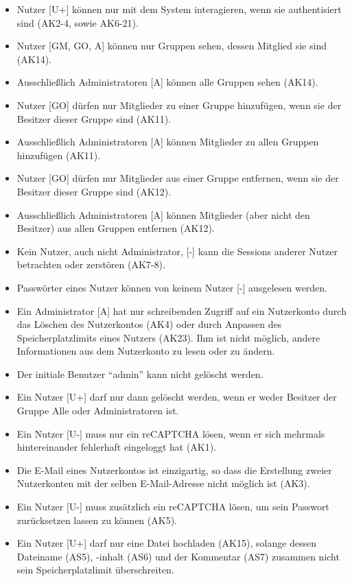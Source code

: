 \documentclass[fontsize=12pt,DIV=14,BCOR=10mm,a4paper,parskip=half-,headsepline,headinclude,english,ngerman,bibliography=totocnumbered]{scrreprt}
\begin{document}
\label{security-policies:new_policies}
\begin{itemize}
  \item Nutzer [U+] können nur mit dem System interagieren, wenn sie authentisiert sind (AK2-4, sowie AK6-21).
  \item Nutzer [GM, GO, A] können nur Gruppen sehen, dessen Mitglied sie sind (AK14).
  \item Ausschließlich Administratoren [A] können alle Gruppen sehen (AK14).
  \item Nutzer [GO] dürfen nur Mitglieder zu einer Gruppe hinzufügen, wenn sie der Besitzer dieser Gruppe sind (AK11).
  \item Ausschließlich Administratoren [A] können Mitglieder zu allen Gruppen hinzufügen (AK11).
  \item Nutzer [GO] dürfen nur Mitglieder aus einer Gruppe entfernen, wenn sie der Besitzer dieser Gruppe sind (AK12).
  \item Ausschließlich Administratoren [A] können Mitglieder (aber nicht den Besitzer) aus allen Gruppen entfernen (AK12).
  \item Kein Nutzer, auch nicht Administrator, [-] kann die Sessions anderer Nutzer betrachten oder zerstören (AK7-8).
  \item Passwörter eines Nutzer können von keinem Nutzer [-] ausgelesen werden.
  \item Ein Administrator [A] hat nur schreibenden Zugriff auf ein Nutzerkonto durch das Löschen des Nutzerkontos (AK4) oder durch Anpassen des Speicherplatzlimits eines Nutzers (AK23). Ihm ist nicht möglich, andere Informationen aus dem Nutzerkonto zu lesen oder zu ändern.
  \item Der initiale Benutzer \enquote{admin} kann nicht gelöscht werden.
  \item Ein Nutzer [U+] darf nur dann gelöscht werden, wenn er weder Besitzer der Gruppe Alle oder Administratoren ist.
  \item Ein Nutzer [U-] muss nur ein reCAPTCHA lösen, wenn er sich mehrmals hintereinander fehlerhaft eingeloggt hat (AK1).
  \item Die E-Mail eines Nutzerkontos ist einzigartig, so dass die Erstellung zweier Nutzerkonten mit der selben E-Mail-Adresse nicht möglich ist (AK3).
  \item Ein Nutzer [U-] muss zusätzlich ein reCAPTCHA lösen, um sein Passwort zurücksetzen lassen zu können (AK5).
  \item Ein Nutzer [U+] darf nur eine Datei hochladen (AK15), solange dessen Dateiname (AS5), -inhalt (AS6) und der Kommentar (AS7) zusammen nicht sein Speicherplatzlimit überschreiten.

\end{itemize}
\end{document}

